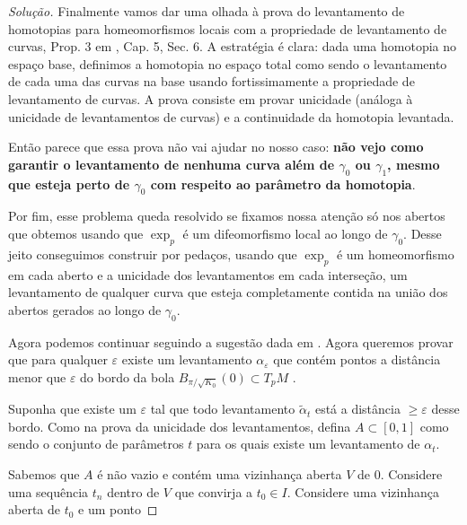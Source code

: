 \begin{proof}[Solução]
Finalmente vamos dar uma olhada à prova do levantamento de homotopias para homeomorfismos locais com a propriedade de levantamento de curvas, Prop. 3 em \cite{docsu}, Cap. 5, Sec. 6. A estratégia é clara: dada uma homotopia no espaço base, definimos a homotopia no espaço total como sendo o levantamento de cada uma das curvas na base usando fortissimamente a propriedade de levantamento de curvas. A prova consiste em provar unicidade (análoga à unicidade de levantamentos de curvas) e a continuidade da homotopia levantada.

Então parece que essa prova não vai ajudar no nosso caso: \textbf{não vejo como garantir o levantamento de nenhuma curva além de \(\gamma_0\) ou \(\gamma_1\), mesmo que esteja perto de \(\gamma_0\) com respeito ao parâmetro da homotopia}.

Por fim, esse problema queda resolvido se fixamos nossa atenção só nos abertos que obtemos usando que \(\operatorname{exp}_p\) é um difeomorfismo local ao longo de \(\gamma_0\). Desse jeito conseguimos construir por pedaços, usando que \(\operatorname{exp}_p\) é um homeomorfismo em cada aberto e a unicidade dos levantamentos em cada interseção, um levantamento de qualquer curva que esteja completamente contida na união dos abertos gerados ao longo de \(\gamma_0\).

Agora podemos continuar seguindo a sugestão dada em \cite{doc}. Agora queremos provar que para qualquer \(\varepsilon\) existe um levantamento \(\alpha_\varepsilon\) que contém pontos a distância menor que \(\varepsilon\) do bordo da bola \(B_{\pi/\sqrt{K_0}}(0)\subset T_pM\) .

Suponha que existe um \(\varepsilon\) tal que todo levantamento \(\tilde{\alpha}_t\) está a distância \(\geq \varepsilon\) desse bordo. Como na prova da unicidade dos levantamentos, defina \(A \subset [0,1]\) como sendo o conjunto de parâmetros \(t\) para os quais existe um levantamento de \(\alpha_t\).

Sabemos que \(A\) é não vazio e contém uma vizinhança aberta \(V\) de 0. Considere uma sequência \(t_n\) dentro de \(V\) que convirja a \(t_0 \in I\). Considere uma vizinhança aberta de \(t_0\) e um ponto 

\end{proof}

